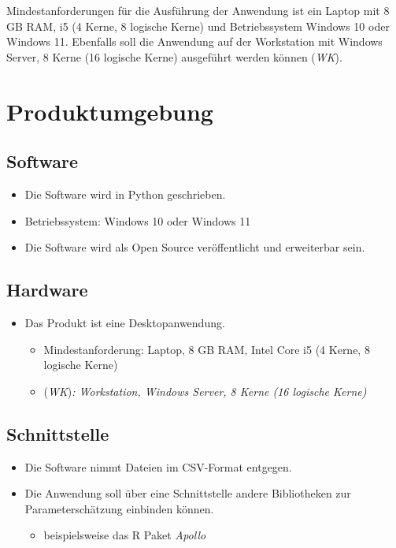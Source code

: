 \documentclass{article}
\begin{document}
Mindestanforderungen für die Ausführung der Anwendung ist ein Laptop mit 8 GB RAM, i5 (4 Kerne, 8 logische Kerne) und Betriebssystem Windows 10 oder Windows 11. Ebenfalls soll die Anwendung auf der Workstation mit Windows Server, 8 Kerne (16 logische Kerne) ausgeführt werden können (\textit{WK}).

\clearpage
\section{Produktumgebung}
\subsection{Software}
\begin{itemize}
    \item Die Software wird in Python geschrieben.
    \item Betriebssystem: Windows 10 oder Windows 11
    \item Die Software wird als Open Source veröffentlicht und erweiterbar sein.
\end{itemize}
\subsection{Hardware}
\begin{itemize}
    \item Das Produkt ist eine Desktopanwendung.
    \begin{itemize}
        \item Mindestanforderung: Laptop, 8 GB RAM, Intel Core i5 (4 Kerne, 8 logische Kerne)
        \item (\textit{WK})\textit{: Workstation, Windows Server, 8 Kerne (16 logische Kerne)}
    \end{itemize}
\end{itemize}
\subsection{Schnittstelle}
\begin{itemize}
    \item Die Software nimmt Dateien im CSV-Format entgegen.
    \item Die Anwendung soll über eine Schnittstelle andere Bibliotheken zur Parameterschätzung einbinden können.
    \begin{itemize}
        \item beispielsweise das R Paket \emph{Apollo}
    \end{itemize}
\end{itemize}
\end{document}
